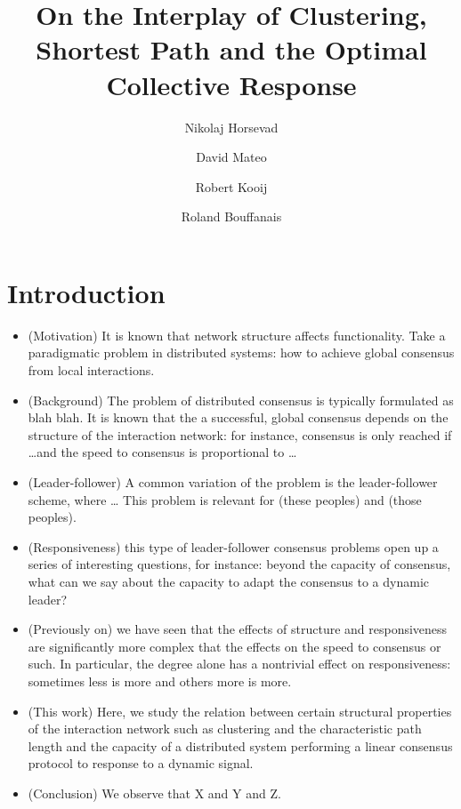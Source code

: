 \documentclass[fleqn,10pt]{wlscirep}
\title{On the Interplay of Clustering, Shortest Path and the Optimal Collective Response}
\author[1,*]{Nikolaj Horsevad}
\author[2,+]{David Mateo}
\author[3.+]{Robert Kooij}
\author[1,+]{Roland Bouffanais}
\affil[1]{Affiliation, department, city, postcode, country}
\affil[2]{Affiliation, department, city, postcode, country}
\affil[3]{Affiliation, department, city, postcode, country}
\affil[*]{nikolajhorsevad@gmail.com}
\affil[+]{these authors contributed equally to this work}
\begin{document}
\flushbottom
\maketitle
%
%
\thispagestyle{empty}


\section*{Introduction}

\begin{itemize}
    \item (Motivation) It is known that network structure affects functionality.
    Take a paradigmatic problem in distributed systems: how to achieve global consensus from local interactions.
    \item (Background) The problem of distributed consensus is typically formulated as blah blah.
    It is known that the a successful, global consensus depends on the structure of the interaction network: for instance, consensus is only reached if \ldots and the speed to consensus is proportional to \ldots
    \item (Leader-follower) A common variation of the problem is the leader-follower scheme, where \ldots
    This problem is relevant for (these peoples) and (those peoples).
    \item (Responsiveness) this type of leader-follower consensus problems open up a series of interesting questions, for instance: beyond the capacity of consensus, what can we say about the capacity to adapt the consensus to a dynamic leader?
    \item (Previously on) we have seen that the effects of structure and responsiveness are significantly more complex that the effects on the speed to consensus or such.
    In particular, the degree alone has a nontrivial effect on responsiveness: sometimes less is more and others more is more.
    \item (This work) Here, we study the relation between certain structural properties of the interaction network such as clustering and the characteristic path length and the capacity of a distributed system performing a linear consensus protocol to response to a dynamic signal.
    \item (Conclusion) We observe that X and Y and Z.

\end{itemize}
\end{document}
